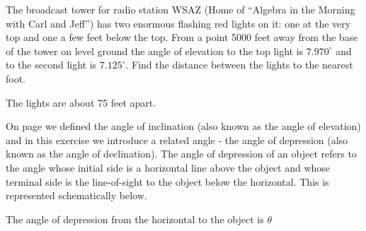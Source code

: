 \documentclass{ximera}
\begin{document}
\begin{problem}
The broadcast tower for radio station WSAZ (Home of ``Algebra in the Morning with Carl and Jeff'') has two enormous flashing red lights on it: one at the very top and one a few feet below the top.  From a point 5000 feet away from the base of the tower on level ground the angle of elevation to the top light is $7.970^{\circ}$ and to the second light is $7.125^{\circ}$.  Find the distance between the lights to the nearest foot.

\begin{solution}
The lights are about 75 feet apart.
\end{solution}
\end{problem}

\begin{problem}
On page \pageref{angleofelevation} we defined the angle of inclination (also known as the angle of elevation) and in this exercise we introduce a related angle -  the angle of depression (also known as  the angle of declination).  The angle of depression of an object refers to the angle whose initial side is a horizontal line above the object and whose terminal side is the line-of-sight to the object below the horizontal.  This is represented schematically below.
\label{angleofdepression}

\begin{center}


The angle of depression from the horizontal to the object is $\theta$

\end{center}


\end{problem}
\end{document}
